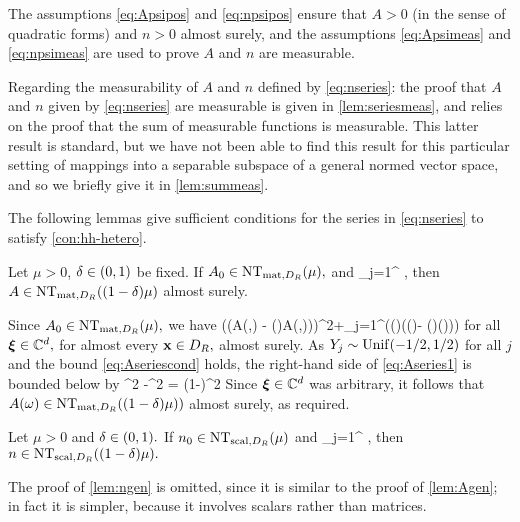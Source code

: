 The assumptions \eqref{eq:Apsipos} and \eqref{eq:npsipos} ensure that $A > 0$ (in the sense of quadratic forms) and $n > 0$  almost surely, and the assumptions \eqref{eq:Apsimeas} and \eqref{eq:npsimeas} are used to prove $A$ and $n$ are measurable.

Regarding the measurability of $A$ and $n$ defined by \eqref{eq:nseries}: the proof that $A$ and $n$ given by \eqref{eq:nseries} are measurable is given in \cref{lem:seriesmeas}, and relies on the proof that the sum of measurable functions
is measurable. This latter result is standard, but we have not been able to find this result for this particular setting of mappings
into a separable subspace of a general normed vector space, and so we briefly give it in \cref{lem:summeas}. 

The following lemmas give sufficient conditions for the series in \eqref{eq:nseries} to satisfy \cref{con:hh-hetero}.

\label{lem:Agen}
Let $\mu > 0$, $\delta \in \mleft(0,1\mright)$ be fixed. If $\Az \in \NTA{\mu},$ and
\beq\label{eq:Aseriescond}
\sum_{j=1}^\infty \NLiDRop{\Psij(\bx) - \mleft(\bx\cdot\grad\mright)\Psij(\bx)} \delta\mu,
\eeq
then $A \in \NTA{(1-\delta)\mu}$ almost surely.
\ele

Since $\Az \in \NTA{\mu},$ we have 
\beq\label{eq:Aseries1}
\Big(\mleft(A(\omega,\bx) - \mleft(\bx\cdot\grad\mright)A(\omega,\bx)\mright)\bxi\Big)\cdot\bxib \geq\mu \abs{\bxi}^2+\sum_{j=1}^\infty  \Big(\Yj(\omega)\mleft(\Psij(\bx)- \mleft(\bx\cdot\grad\mright)\Psij(\bx)\mright)\bxi\Big)\cdot\bxib
\eeq
for all $\boldsymbol{\xi} \in \mathbb C^{d},$ for almost every $\mathbf{x} \in D_{R},$ almost surely. As $Y_{j} \sim \mathrm{Unif}(-1/2,1/2)$ for all $j$ and the bound \eqref{eq:Aseriescond} holds, the right-hand side of \eqref{eq:Aseries1} is bounded below by
\beqs
\mu \abs{\bxi}^2 -\delta \mu \abs{\bxi}^2 = (1-\delta)\mu\abs{\bxi}^2
\eeqs
Since $\boldsymbol{\xi} \in \mathbb C^{d}$ was arbitrary, it follows that $A(\omega) \in \NTA{(1-\delta)\mu)}$ almost surely, as required.
\epf

\label{lem:ngen}
Let $\mu > 0$ and $\delta \in \mleft(0,1\mright).$ If $\nz \in \NTn{\mu}$ and
\beq\label{eq:nseriescond}
\sum_{j=1}^\infty\NLiDRRR{\psij(\bx) + \bx\cdot\grad\psij(\bx)} \delta\mu,
\eeq
then $n \in \NTn{(1-\delta)\mu}.$
\ele

The proof of \cref{lem:ngen} is omitted, since it is similar to the proof of \cref{lem:Agen}; in fact it is simpler, because it involves scalars rather than matrices.
